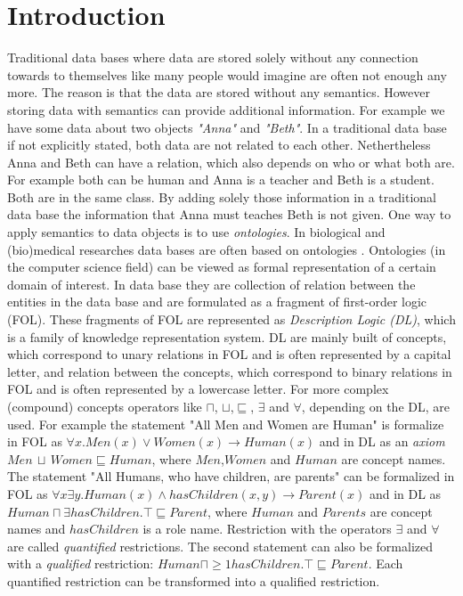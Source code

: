 \documentclass[a4paper,11pt]{scrartcl}
\theoremstyle{break}
\theoremstyle{definition}
\begin{document}
\tableofcontents
\newpage
\section{Introduction}
Traditional data bases where data are stored solely without any connection towards to themselves like many people would imagine are often not enough any more. The reason is that the data are stored without any semantics. However storing data with semantics can provide additional information. For example we have some data about two objects \textit{"Anna"} and \textit{"Beth"}. In a traditional data base if not explicitly stated, both data are not related to each other. Nethertheless Anna and Beth can have a relation, which also depends on who or what both are. For example both can be human and Anna is a teacher and Beth is a student. Both are in the same class. By adding solely those information in a traditional data base the information that Anna must teaches Beth is not given. One way to apply semantics to data objects is to use \textit{ontologies}. In biological and (bio)medical researches data bases are often based on ontologies \cite{bio}. Ontologies (in the computer science field) can be viewed as formal representation of a certain domain of interest. In data base they are collection of relation between the entities in the data base and are formulated as a fragment of first-order logic (FOL). These fragments of FOL are represented as \textit{Description Logic (DL)}, which is a family of knowledge representation system. DL are mainly built of concepts, which correspond to unary relations in FOL and is often represented by a capital letter, and relation between the concepts, which correspond to binary relations in FOL and is often represented by a lowercase letter. For more complex (compound) concepts operators like $\sqcap$, $\sqcup$,$\sqsubseteq$, $\exists$ and $\forall$, depending on the DL, are used. For example the statement "All Men and Women are Human" is formalize in FOL as $\forall x.Men(x)\vee Women(x)\rightarrow Human(x)$ and in DL as an \textit{axiom} $Men\,\sqcup\, Women\sqsubseteq Human$, where $Men$,$Women$ and $Human$ are concept names. The statement "All Humans, who have children, are parents" can be formalized in FOL as $\forall x \exists y. Human(x)\wedge hasChildren(x,y)\rightarrow Parent(x)$ and in DL as $Human\sqcap \exists hasChildren.\top \sqsubseteq Parent$, where $Human$ and $Parents$ are concept names and $hasChildren$ is a role name. Restriction with the operators $\exists$ and $\forall$ are called \textit{quantified} restrictions. The second statement can also be formalized with a \textit{qualified} restriction: $Human\sqcap \geq 1 hasChildren.\top\sqsubseteq Parent$. Each quantified restriction can be transformed into a qualified restriction.\\
\end{document}
